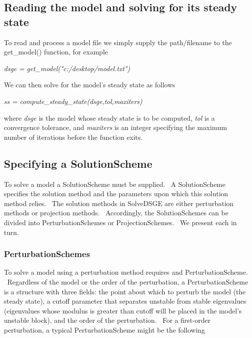 \documentclass[notitlepage,11pt]{article}
\begin{document}
\subsection{Reading the model and solving for its steady state}

To read and process a model file we simply supply the path/filename to the
get\_model() function, for example

\bigskip

\textit{dsge = get\_model("c:/desktop/model.txt")}

\bigskip

We can then solve for the model's steady state as follows

\bigskip

\textit{ss = compute\_steady\_state(dsge,tol,maxiters)}

\bigskip

where \textit{dsge} is the model whose steady state is to be computed, 
\textit{tol} is a convergence tolerance, and \textit{maxiters} is an integer
specifying the maximum number of iterations before the function exits.

\subsection{Specifying a SolutionScheme}

To solve a model a SolutionScheme must be supplied. \ A SolutionScheme
specifies the solution method and the parameters upon which this solution
method relies. \ The solution methods in SolveDSGE are either perturbation
methods or projection methods. \ Accordingly, the SolutionSchemes can be
divided into PerturbationSchemes or ProjectionSchemes. \ We present each in
turn.

\subsubsection{PerturbationSchemes}

To solve a model using a perturbation method requires and
PerturbationScheme. \ Regardless of the model or the order of the
perturbation, a PerturbationScheme is a structure with three fields: the
point about which to perturb the model (the steady state), a cutoff
parameter that separates unstable from stable eigenvalues (eigenvalues whose
modulus is greater than cutoff will be placed in the model's unstable
block), and the order of the perturbation. \ For a first-order perturbation,
a typical PerturbationScheme might be the following
\end{document}
